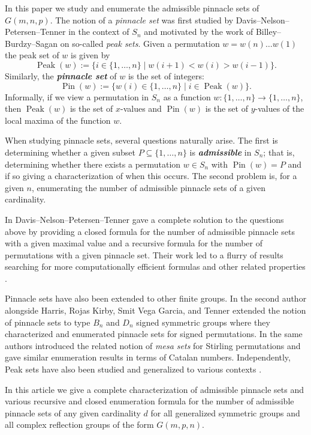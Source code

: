\documentclass[12pt,reqno]{amsart}
\numberwithin{equation}{section}
\theoremstyle{plain}
\theoremstyle{definition}
\theoremstyle{remark}
\newcommand{\Pin}{\operatorname{Pin}}
\newcommand{\Peak}{\operatorname{Peak}}
\newcommand{\newword}[1]{\emph{\textbf{#1}}}
\begin{document}
In this paper we study and enumerate the admissible pinnacle sets of $G(m,n,p)$. The notion of a \emph{pinnacle set} was first studied by Davis--Nelson--Petersen--Tenner \cite{PinnaclesTypeA} in the context of $S_n$ and motivated by the work of Billey--Burdzy--Sagan \cite{BBS} on so-called \emph{peak sets}. Given a permutation $w = w(n)\dots w(1)$ the peak set of $w$ is given by
\[
\Peak(w):= \{ i \in \{1,\dots,n\} \; |\; w(i+1)<w(i)> w(i-1) \}.
\]
Similarly, the \newword{pinnacle set} of $w$ is the set of integers:
\[
\Pin(w):= \{ w(i) \in \{1,\dots,n\} \; |\; i \in \Peak(w) \}.
\]
Informally, if we view a permutation in $S_n$ as a function $w:\{1,\dots,n\} \to \{1,\dots,n\}$, then $\Peak(w)$ is the set of $x$-values and $\Pin(w)$ is the set of $y$-values of the local maxima of the function $w$. 


When studying pinnacle sets, several questions naturally arise. The first is determining whether a given subset $P \subseteq \{1,\dots,n\}$ is \newword{admissible} in $S_n$; that is, determining whether there exists a permutation $w \in S_n$ with $\Pin(w)=P$ and if so giving a characterization of when this occurs. The second problem is, for a given $n$, enumerating the number of admissible pinnacle sets of a given cardinality.  

In \cite{PinnaclesTypeA} Davis--Nelson--Petersen--Tenner gave a complete solution to the questions above by providing a closed formula for the number of admissible pinnacle sets with a given maximal value and a recursive formula for the number of permutations with a given pinnacle set. Their work led to a flurry of results searching for more computationally efficient formulas \cite{DHHIN,FNT, DLMSSS, fang, Minnich} and other related properties \cite{rusu, rusu-tenner}. 

Pinnacle sets have also been extended to other finite groups. In \cite{PinSignedPermutations} the second author alongside Harris, Rojas Kirby, Smit Vega Garcia, and Tenner extended the notion of pinnacle sets to type $B_n$ and $D_n$ signed symmetric groups where they characterized and enumerated pinnacle sets for signed permutations. In \cite{MesasStirling} the same authors introduced the related notion of \emph{mesa sets} for Stirling permutations and gave similar enumeration results in terms of Catalan numbers. 
Independently, Peak sets have also been studied and generalized to various contexts \cite{CDOPZ,DHIP,DHIOS,DEHIMO}. 

In this article we give a complete characterization of admissible pinnacle sets and various recursive and closed enumeration formula for the number of admissible pinnacle sets of any given cardinality $d$ for all generalized symmetric groups and all complex reflection groups of the form $G(m,p,n)$. 
\end{document}
